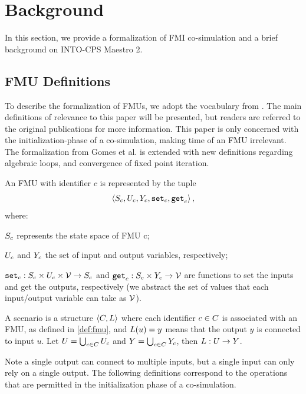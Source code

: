 \section{Background}\label{sc:background}
In this section, we provide a formalization of FMI co-simulation and a brief background on INTO-CPS Maestro 2.

\subsection{FMU Definitions}
To describe the formalization of FMUs, we adopt the vocabulary from \cite{gomes_lucio_vangheluwe_2019}. The main definitions of relevance to this paper will be presented, but readers are referred to the original publications for more information. This paper is only concerned with the initialization-phase of a co-simulation, making time of an FMU irrelevant. The formalization from Gomes et al.\cite{gomes_lucio_vangheluwe_2019} is extended with new definitions regarding algebraic loops, and convergence of fixed point iteration.
\begin{definition}[FMU]\label{def:fmu}
  An FMU with identifier $c$ is represented by the tuple   
  $$ \left\langle S_{c}, U_{c}, Y_{c}, \mathtt{set}_{c}, \mathtt{get}_{c} \right\rangle ,$$
  where:
  \begin{inparadesc}
    \item $S_{c}$ represents the state space of FMU c;
    \item $U_{c}$ and $Y_{c}$ the set of input and output variables, respectively;
    \item $\mathtt{set}_{c} : S_{c} \times U_{c} \times \mathcal{V} \to S_{c}$ and $\mathtt{get}_{c}: S_{c} \times Y_{c} \to \mathcal{V}$ are functions to set the inputs and get the outputs, respectively (we abstract the set of values that each input/output variable can take as $\mathcal{V}$).
  \end{inparadesc}
\end{definition}

\begin{definition}[Scenario]\label{def:cosim_scenario}
  A scenario is a structure $ \left\langle C, L \right\rangle $ where each identifier $c \in C$ is associated with an FMU, as defined in \cref{def:fmu}, and $L(u)=y$ means that the output $y$ is connected to input $u$.
  Let $U = \bigcup_{c \in C} U_{c}$ and $Y = \bigcup_{c \in C} Y_{c}$, then $L : U \to Y$.
\end{definition}
Note a single output can connect to multiple inputs, but a single input can only rely on a single output.
The following definitions correspond to the operations that are permitted in the initialization phase of a co-simulation.

